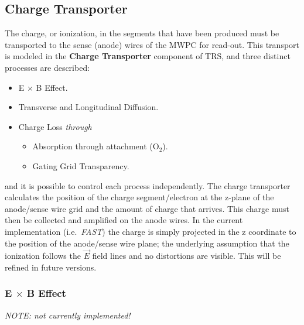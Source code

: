 \documentclass[twoside]{article}
\newcommand{\name}[1]{\textsf{#1}}%
\begin{document}
\subsection{Charge Transporter}

The charge, or ionization, in the segments that have been produced
must be transported to the sense (anode) wires of the MWPC for read-out.  
This transport is modeled in the {\bf Charge Transporter} component of 
\name{TRS}, and three distinct processes are described:
\begin{itemize}
   \item E $\times$ B Effect.
   \item Transverse and Longitudinal Diffusion.
   \item Charge Loss {\em through}
   \begin{itemize}   
     \item Absorption through attachment (O$_{2}$).
     \item Gating Grid Transparency.
     \end{itemize}
\end{itemize}
and it is possible to control each process independently.
The charge transporter calculates the position of the charge
segment/electron at the z-plane of the anode/sense wire grid
and the amount of charge that arrives.  This charge must then
be collected and amplified on the anode wires.  In the
current implementation (i.e.~{\em FAST}) the charge is simply projected
in the z coordinate to the position of the anode/sense wire plane;
the underlying assumption that the ionization follows the $\vec{E}$
field lines and no distortions are visible.  This will be refined
in future versions.

\subsubsection{E $\times$ B Effect} {\em NOTE: not currently implemented!}
        
\end{document}
